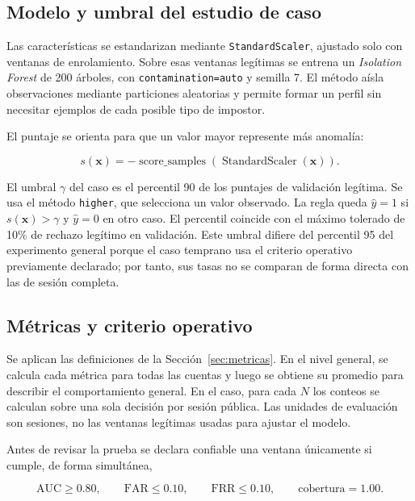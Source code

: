 \documentclass[11pt,letterpaper]{article}
\newcommand{\far}{\mathrm{FAR}}
\newcommand{\frr}{\mathrm{FRR}}
\newcommand{\auc}{\mathrm{AUC}}
\begin{document}
\subsection{Modelo y umbral del estudio de caso}

Las características se estandarizan mediante \texttt{StandardScaler}, ajustado solo con ventanas de enrolamiento. Sobre
esas ventanas legítimas se entrena un \emph{Isolation Forest} \cite{liu2008} de 200 árboles, con
\texttt{contamination=auto} y semilla 7. El método aísla observaciones mediante particiones aleatorias y permite
formar
un perfil sin necesitar ejemplos de cada posible tipo de impostor.

El puntaje se orienta para que un valor mayor represente más anomalía:

\begin{equation}
  s(\mathbf{x})=-\operatorname{score\_samples}
  \left(\operatorname{StandardScaler}(\mathbf{x})\right).
\end{equation}

El umbral $\gamma$ del caso es el percentil 90 de los puntajes de validación legítima. Se usa el método
\texttt{higher}, que selecciona un valor observado. La regla queda $\widehat{y}=1$ si $s(\mathbf{x})>\gamma$ y
$\widehat{y}=0$ en otro caso. El percentil coincide con el máximo tolerado de 10\% de rechazo legítimo en validación.
Este umbral difiere del percentil 95 del experimento general porque el caso temprano usa el criterio operativo
previamente declarado; por tanto, sus tasas no se comparan de forma directa con las de sesión completa.

\subsection{Métricas y criterio operativo}

Se aplican las definiciones de la Sección~\ref{sec:metricas}. En el nivel general, se calcula cada métrica para todas
las cuentas y luego se obtiene su promedio para describir el comportamiento general. En el caso, para cada $N$ los conteos se calculan sobre una sola
decisión por sesión pública. Las unidades de evaluación son sesiones, no las ventanas legítimas usadas para ajustar el
modelo.

Antes de revisar la prueba se declara confiable una ventana únicamente si cumple, de forma simultánea,

\begin{equation}
  \auc\geq0.80, \qquad \far\leq0.10, \qquad \frr\leq0.10,
  \qquad \text{cobertura}=1.00.
\end{equation}
\end{document}
